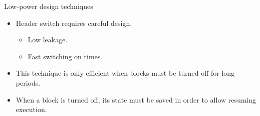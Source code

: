 \documentclass[]{slides}
\begin{document}
\begin{frame}{Low-power design techniques}{}
\begin{itemize}
\item Header switch  requires careful design.
\begin{itemize}
  \item Low leakage.
  \item Fast switching on times.
\end{itemize}
\item This technique is only efficient when blocks must be turned off for long periods.
\item When a block is turned off, its state must be saved in order to allow resuming execution.
\end{itemize}

\end{frame}




\end{document}
